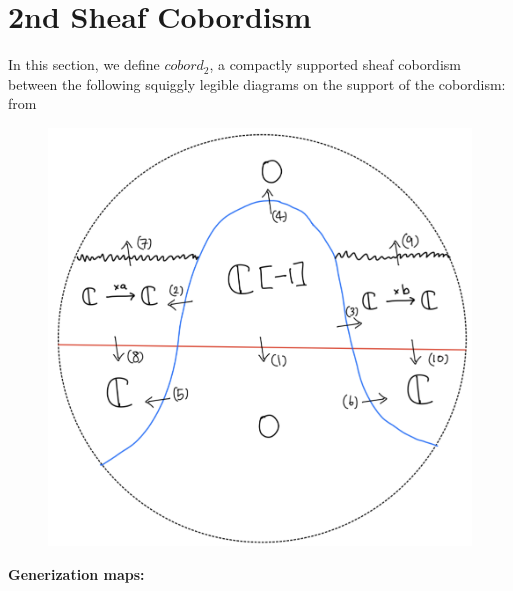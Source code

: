\section{2nd Sheaf Cobordism}
In this section, we define $cobord_2$, a compactly supported sheaf cobordism between the following squiggly legible diagrams on the support of the cobordism:\\
from
\begin{figure}[H]
    \centering
    \includegraphics[scale = 0.45]{diagrams/lemma2/29.png} 
    \caption{}
    \label{fig:your-label}
\end{figure}
\textbf{Generization maps:}
